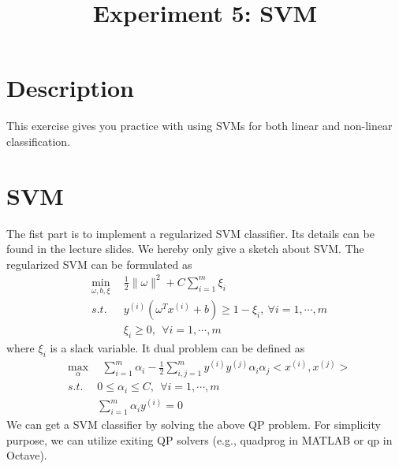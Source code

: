 \documentclass[10pt,a4paper]{article}
\begin{document}
\title{Experiment 5: SVM}

\maketitle
  
\section{Description}
%
  This exercise gives you practice with using SVMs for both linear and non-linear classification.





\section{SVM}
%
  The fist part is to implement a regularized SVM classifier. Its details can be found in the lecture slides. We hereby only give a sketch about SVM. The regularized SVM can be formulated as
  \begin{eqnarray*}
    &\underset{\omega, b, \xi}{\min}& ~~ \frac{1}{2} \|\omega\|^2 + C \sum^m_{i=1} \xi_i \\
    &s.t.& ~~ y^{(i)} \left(\omega^T x^{(i)} + b \right) \geq 1-\xi_i, ~\forall i=1,\cdots, m \\
    && ~~ \xi_i \geq 0, ~~\forall i=1,\cdots,m
  \end{eqnarray*}
  where $\xi_i$ is a slack variable. It dual problem can be defined as
  \begin{eqnarray*}
    &\underset{\alpha}{\max}& ~~ \sum^m_{i=1} \alpha_i - \frac{1}{2} \sum^m_{i,j=1} y^{(i)} y^{(j)} \alpha_i \alpha_j <x^{(i)}, x^{(j)}> \\
    &s.t.& 0 \leq \alpha_i \leq C, ~~\forall i=1,\cdots,m \\
    && \sum^m_{i=1}\alpha_i y^{(i)} = 0
  \end{eqnarray*}
  We can get a SVM classifier by solving the above QP problem. For simplicity purpose, we can utilize exiting QP solvers (e.g., \textsf{quadprog} in MATLAB or \textsf{qp} in Octave). 
\end{document}
